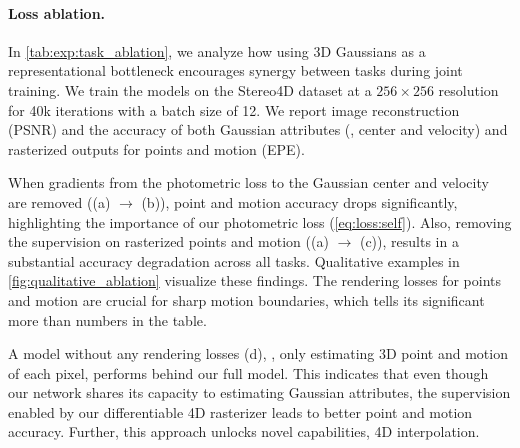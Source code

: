 \paragraph{Loss ablation.}
In \cref{tab:exp:task_ablation}, we analyze how using 3D Gaussians as a representational bottleneck encourages synergy between tasks during joint training.
We train the models on the Stereo4D dataset at a $256\times256$ resolution for 40k iterations with a batch size of 12.
We report image reconstruction (PSNR) and the accuracy of both Gaussian attributes (\ie, center and velocity) and rasterized outputs for points and motion (EPE).

When gradients from the photometric loss to the Gaussian center and velocity are removed ((a) $\rightarrow$ (b)), point and motion accuracy drops significantly, highlighting the importance of our photometric loss (\cref{eq:loss:self}).
Also, removing the supervision on rasterized points and motion ((a) $\rightarrow$ (c)), results in a substantial accuracy degradation across all tasks.
Qualitative examples in \cref{fig:qualitative_ablation} visualize these findings.
The rendering losses for points and motion are crucial for sharp motion boundaries, which tells its significant more than numbers in the table.

A model without any rendering losses (d), \ie, only estimating 3D point and motion of each pixel, performs behind our full model.
This indicates that even though our network shares its capacity to estimating Gaussian attributes, the supervision enabled by our differentiable 4D rasterizer leads to better point and motion accuracy.
Further, this approach unlocks novel capabilities, 4D interpolation.

